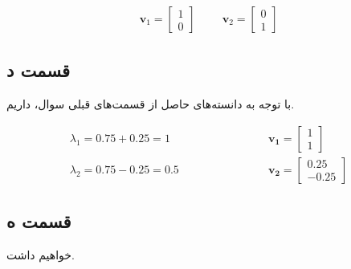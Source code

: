 \documentclass[14pt,a4]{article}
\begin{document}
\begin{eqnarray*}
    \textbf{v}_1 = \begin{bmatrix}1\\ 0\end{bmatrix} \hspace{1cm} \textbf{v}_2 = \begin{bmatrix}0\\ 1\end{bmatrix}
\end{eqnarray*}

\subsection*{قسمت د}

با توجه به دانسته‌های حاصل از قسمت‌های قبلی سوال، داریم.

\begin{align*}
    \lambda_1 = 0.75 + 0.25 = 1  & \hspace{3cm}
    \boldsymbol{v_1} = \begin{bmatrix}
            1 \\
            1
        \end{bmatrix}
    \\
    \lambda_2  =   0.75 - 0.25 = 0.5  & \hspace{3cm}
    \boldsymbol{v_2} = \begin{bmatrix}
            0.25 \\
            -0.25
        \end{bmatrix}
\end{align*}

\subsection*{قسمت ه}

خواهیم داشت.
\end{document}
